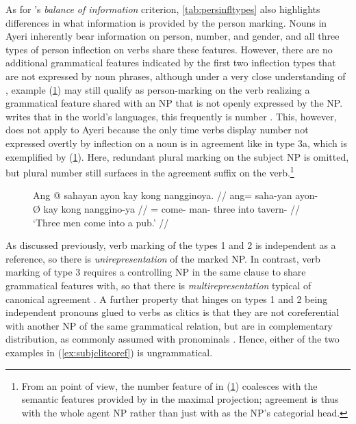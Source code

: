 As for \citet{corbett2006}'s \emph{balance of information} criterion,
\autoref{tab:persinfltypes} also highlights differences in what information is
provided by the person marking. Nouns in Ayeri inherently bear information on
person, number, and gender, and all three types of person inflection on verbs
share these features. However, there are no additional grammatical features
indicated by the first two inflection types that are not expressed by noun
phrases, although under a very close understanding of \citet{corbett2006},
example (\ref{ex:verbplagr}) may still qualify as person-marking on the verb
realizing a grammatical feature shared with an NP that is not openly expressed
by the NP. \citet{corbett2006} writes that in the world's languages, this
frequently is number \citep[105]{corbett2006}. This, however, does not apply to
Ayeri because the only time verbs display number not expressed overtly by
inflection on a noun is in agreement like in type 3a, which is
exemplified by (\ref{ex:verbplagr}). Here, redundant plural marking on the
subject NP is omitted, but plural number still surfaces in the agreement suffix
on the verb.\footnote{From an \Lfg{} point of view, the
number feature of  in (\ref{ex:verbplagr}) coalesces with the
semantic features provided by  in the maximal projection;
agreement is thus with the whole agent NP rather than just with
 as the NP's categorial head.}

\begin{figure}[h]
\ex\label{ex:verbplagr} %
\begingl
	\gla Ang @ sahayan ayon kay kong nangginoya. //
	\glb ang= saha-yan ayon-Ø kay kong nanggino-ya //
	\glc \AgtT{}= come-\TplM{} man-\Top{} three into tavern-\Loc{} //
	\glft `Three men come into a pub.' //
\endgl\xe
\end{figure}

As discussed previously, verb marking of the types 1 and 2 is independent as a
reference, so there is \emph{unirepresentation} of the marked NP. In contrast,
verb marking of type 3 requires a controlling NP in the same clause to share
grammatical features with, so that there is \emph{multirepresentation} typical
of canonical agreement \citep[106]{corbett2006}.
A further property that hinges on types 1 and 2 being independent pronouns
glued to verbs as clitics is that they are not coreferential with another NP of
the same grammatical relation, but are in complementary distribution, as
commonly assumed with pronominals \citep[108]{corbett2006}. Hence, either of
the two examples in (\ref{ex:subjclitcoref}) is ungrammatical.

